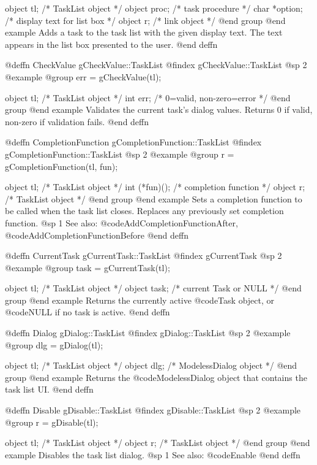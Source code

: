 object  tl;      /*  TaskList object               */
object  proc;    /*  task procedure                 */
char    *option; /*  display text for list box      */
object  r;       /*  link object                    */
@end group
@end example
Adds a task to the task list with the given display text.  The text
appears in the list box presented to the user.
@end deffn



@deffn {CheckValue} gCheckValue::TaskList
@findex gCheckValue::TaskList
@sp 2
@example
@group
err = gCheckValue(tl);

object  tl;    /*  TaskList object          */
int     err;   /*  0=valid, non-zero=error  */
@end group
@end example
Validates the current task's dialog values.  Returns 0 if valid,
non-zero if validation fails.
@end deffn



@deffn {CompletionFunction} gCompletionFunction::TaskList
@findex gCompletionFunction::TaskList
@sp 2
@example
@group
r = gCompletionFunction(tl, fun);

object  tl;    /*  TaskList object          */
int     (*fun)();  /*  completion function  */
object  r;     /*  TaskList object          */
@end group
@end example
Sets a completion function to be called when the task list closes.
Replaces any previously set completion function.
@sp 1
See also:  @code{AddCompletionFunctionAfter}, @code{AddCompletionFunctionBefore}
@end deffn



@deffn {CurrentTask} gCurrentTask::TaskList
@findex gCurrentTask
@sp 2
@example
@group
task = gCurrentTask(tl);

object  tl;     /*  TaskList object            */
object  task;   /*  current Task or NULL       */
@end group
@end example
Returns the currently active @code{Task} object, or @code{NULL} if no
task is active.
@end deffn



@deffn {Dialog} gDialog::TaskList
@findex gDialog::TaskList
@sp 2
@example
@group
dlg = gDialog(tl);

object  tl;    /*  TaskList object         */
object  dlg;   /*  ModelessDialog object   */
@end group
@end example
Returns the @code{ModelessDialog} object that contains the task list UI.
@end deffn



@deffn {Disable} gDisable::TaskList
@findex gDisable::TaskList
@sp 2
@example
@group
r = gDisable(tl);

object  tl;   /*  TaskList object  */
object  r;    /*  TaskList object  */
@end group
@end example
Disables the task list dialog.
@sp 1
See also:  @code{Enable}
@end deffn



